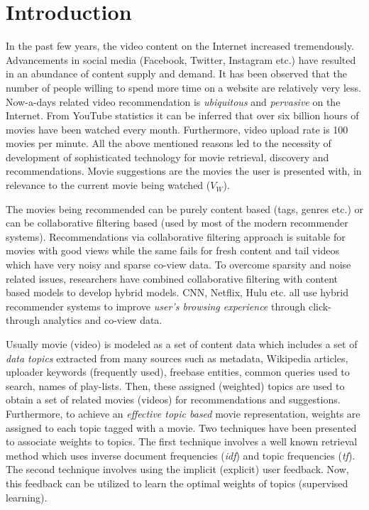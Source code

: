 \chapter{Introduction}

In the past few years, the video content on the Internet increased tremendously. Advancements in social media (Facebook, Twitter, Instagram etc.) have resulted in an abundance of content supply and demand. It has been observed that the number of people willing to spend more time on a website are relatively very less. Now-a-days related video recommendation is \textit{ubiquitous} and \textit{pervasive} on the Internet. From YouTube statistics it can be inferred that over six billion hours of movies have been watched every month. Furthermore, video upload rate is 100 movies per minute. All the above mentioned reasons led to the necessity of development of sophisticated technology for movie retrieval, discovery and recommendations. Movie suggestions are the movies the user is presented with, in relevance to the current movie being watched ($V_W$).\par
The movies being recommended can be purely content based (tags, genres etc.) or can be collaborative filtering based (used by most of the modern recommender systems). Recommendations via collaborative filtering approach is suitable for movies with good views while the same fails for fresh content and tail videos which have very noisy and sparse co-view data. To overcome sparsity and noise related issues, researchers have combined collaborative filtering with content based models to develop hybrid models. CNN, Netflix, Hulu etc. all use hybrid recommender systems to improve \textit{user's browsing experience} through click-through analytics and co-view data.\par
Usually movie (video) is modeled as a set of content data which includes a set of \textit{data topics} extracted from many sources such as metadata, Wikipedia articles, uploader keywords (frequently used), freebase entities, common queries used to search, names of play-lists. Then, these assigned (weighted) topics are used to obtain a set of related movies (videos) for recommendations and suggestions. Furthermore, to achieve an \textit{effective topic based} movie representation, weights are assigned to each topic tagged with a movie. Two techniques have been presented to associate weights to topics. The first technique involves a well known retrieval method which uses  inverse document frequencies (\textit{idf}) and topic frequencies (\textit{tf}). The second technique involves using the implicit (explicit) user feedback. Now, this feedback can be utilized to learn the optimal weights of topics (supervised learning).\par
